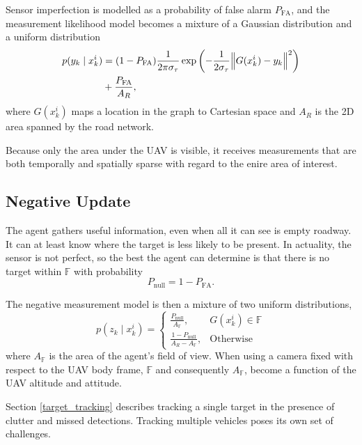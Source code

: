 \documentclass[letterpaper, 10 pt, conference]{ieeeconf}  %
\begin{document}
Sensor imperfection is modelled as a probability of false alarm $P_{\text{FA}}$, and the measurement likelihood model becomes a mixture of a Gaussian distribution and a uniform distribution
\begin{align} \label{eq:measurement_model}
    p(y_k \mid x^i_k) &= (1 - P_{\text{FA}})\frac{1}{2\pi \sigma_\tau}\exp \left(-\frac{1}{2 \sigma_\tau} \norm{ G(x^i_k) - y_k }^2\right) \nonumber \\
    &+ \frac{P_{\text{FA}}}{A_R},
\end{align}
where $G(x^i_k)$ maps a location in the graph to Cartesian space and $A_R$ is the 2D area spanned by the road network.

Because only the area under the UAV is visible, it receives measurements that are both temporally and spatially sparse with regard to the enire area of interest.

\subsection{Negative Update}

The agent gathers useful information, even when all it can see is empty roadway. It can at least know where the target is less likely to be present. In actuality, the sensor is not perfect, so the best the agent can determine is that there is no target within $\mathbb{F}$ with probability
\begin{equation}%
    P_{\text{null}} = 1-P_{\text{FA}}.
\end{equation}

The negative measurement model is then a mixture of two uniform distributions,
\begin{equation}%
    p(z_k \mid x^i_k) =
    \begin{cases}
        \frac{P_{\text{null}}}{A_{\mathbb{F}}}, \quad & G(x^i_k) \in \mathbb{F} \\
        \frac{1 - P_{\text{null}}}{A_R - A_{\mathbb{F}}}, & \text{Otherwise}
    \end{cases}
\end{equation}
where $A_{\mathbb{F}}$ is the area of the agent's field of view. When using a camera fixed with respect to the UAV body frame, $\mathbb{F}$ and consequently $A_{\mathbb{F}}$, become a function of the UAV altitude and attitude.

Section \ref{target_tracking} describes tracking a single target in the presence of clutter and missed detections. Tracking multiple vehicles poses its own set of challenges.
\end{document}
